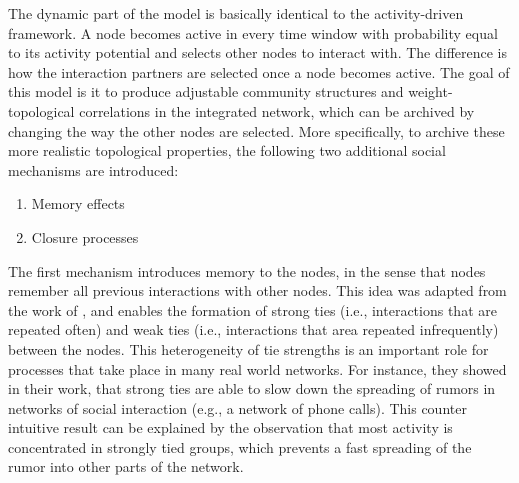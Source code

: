 The dynamic part of the model is basically identical to the activity-driven framework.
A node becomes active in every time window with probability equal to its activity potential and selects other nodes to interact with.
The difference is how the interaction partners are selected once a node becomes active.
The goal of this model is it to produce adjustable community structures and weight-topological correlations in the integrated network, which can be archived by changing the way the other nodes are selected.
More specifically, to archive these more realistic topological properties, the following two additional social mechanisms are introduced:

\begin{enumerate}
    \item Memory effects
    \item Closure processes
\end{enumerate}

The first mechanism introduces memory to the nodes, in the sense that nodes remember all previous interactions with other nodes.
This idea was adapted from the work of \citet{Karsai2014}, and enables the formation of strong ties (i.e., interactions that are repeated often) and weak ties (i.e., interactions that area repeated infrequently) between the nodes.
This heterogeneity of tie strengths is an important role for processes that take place in many real world networks.
For instance, they showed in their work, that strong ties are able to slow down the spreading of rumors in networks of social interaction (e.g., a network of phone calls).
This counter intuitive result can be explained by the observation that most activity is concentrated in strongly tied groups, which prevents a fast spreading of the rumor into other parts of the network.

